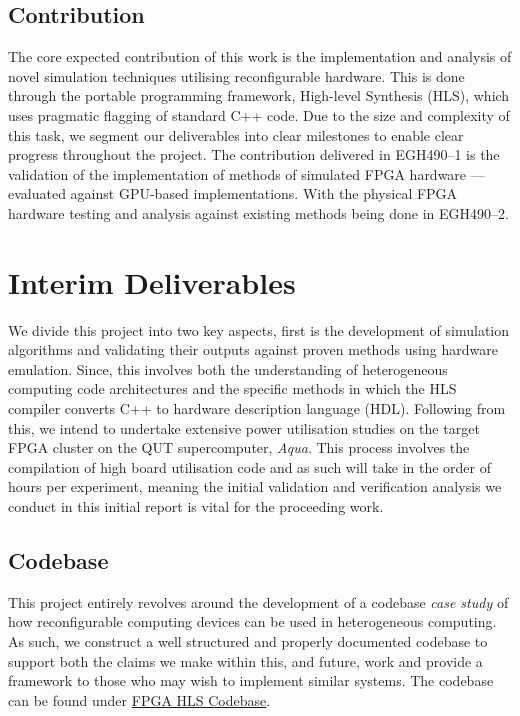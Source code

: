 \documentclass[11pt, a4paper]{article}
\begin{document}
	\subsection{Contribution}
	The core expected contribution of this work is the implementation and analysis of novel simulation techniques utilising reconfigurable hardware. This is done through the portable programming framework, High-level Synthesis (HLS), which uses pragmatic flagging of standard C++ code. Due to the size and complexity of this task, we segment our deliverables into clear milestones to enable clear progress throughout the project. The contribution delivered in EGH490--1 is the validation of the implementation of methods of simulated FPGA hardware --- evaluated against GPU-based implementations. With the physical FPGA hardware testing and analysis against existing methods being done in EGH490--2.

	\section{Interim Deliverables}
	We divide this project into two key aspects, first is the development of simulation algorithms and validating their outputs against proven methods using hardware emulation. Since, this involves both the understanding of heterogeneous computing code architectures and the specific methods in which the HLS compiler converts C++ to hardware description language (HDL). Following from this, we intend to undertake extensive power utilisation studies on the target FPGA cluster on the QUT supercomputer, \textit{Aqua}. This process involves the compilation of high board utilisation code and as such will take in the order of hours per experiment, meaning the initial validation and verification analysis we conduct in this initial report is vital for the proceeding work.
	
	\subsection{Codebase}
	This project entirely revolves around the development of a codebase \textit{case study} of how reconfigurable computing devices can be used in heterogeneous computing. As such, we construct a well structured and properly documented codebase to support both the claims we make within this, and future, work and provide a framework to those who may wish to implement similar systems. The codebase can be found under \hyperlink{https://github.com/LucaLubrano/fpga-hls-codebase}{FPGA HLS Codebase}.
	
\end{document}
